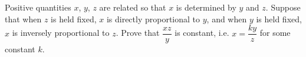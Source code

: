 Positive quantities $x$, $y$, $z$ are related so that $x$ is determined by $y$ and $z$. Suppose that when $z$ is held fixed, $x$ is directly proportional to $y$, and when $y$ is held fixed, $x$ is inversely proportional to $z$. Prove that $\dfrac{xz}{y}$ is constant, i.e. $x=\dfrac{ky}{z}$ for some constant $k$.
